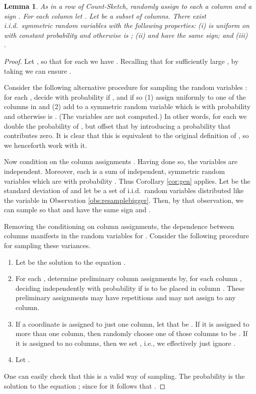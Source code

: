 \documentclass[letterpaper,11pt]{article}
\newtheorem{lemma}[theorem]{Lemma}
\begin{document}
\begin{lemma} \label{lma:maketailbigger}
As in a row of Count-Sketch, randomly assign to each
 a column  and a sign .
For each column  let .
Let  be a subset of  columns.  There exist
i.i.d.\ symmetric random variables  with
the following properties:
(i)  is uniform on  with constant probability
and otherwise is ;
(ii)  and  have the same sign; and
(iii) .
\end{lemma}
\begin{proof}
Let , so that for each  we have
.
Recalling that  for sufficiently large , by
taking  we can ensure .

Consider the following alternative procedure for sampling the random variables :
for each , decide with probability  if , and if so
(1) assign  uniformly to one of the columns  in  and
(2) add to  a symmetric random variable which is  with probability
 and otherwise is .  (The variables  are not computed.)
In other words, for each  we double the probability of ,
but offset that by introducing a  probability that  contributes zero.
It is clear that this is equivalent to the original definition of , so we henceforth work with it.

Now condition on the column assignments .  Having done so,
the variables  are independent.  Moreover, each is a sum of independent,
symmetric random variables which are  with probability .
Thus Corollary \ref{cor:gen} applies.  Let  be the
standard deviation of  and let  be a set of i.i.d.\ random
variables distributed like the variable  in
Observation \ref{obs:resamplebigger}.  Then, by that observation,
we can sample  so that  and  have the same
sign and .

Removing the conditioning on column assignments,
the dependence between columns manifests in the random variables
 for .  Consider
the following procedure for sampling these variances.
\begin{enumerate}
\item Let  be the solution
to the equation .
\item For each , determine preliminary column
assignments by, for each column , deciding independently with probability  if 
is to be placed in column .  These preliminary assignments may have repetitions
and may not assign  to any column.
\item If a coordinate  is assigned to just one column, let that be .
If it is assigned to more than one column, then randomly choose one of those columns
to be .  If it is assigned to no columns, then we set , i.e.,
we effectively just ignore . 
\item Let .
\end{enumerate}
One can easily check that this is a valid way
of sampling.  The probability  is the solution
to the equation ;
since  for  it follows
that .


\end{proof}
\end{document}
